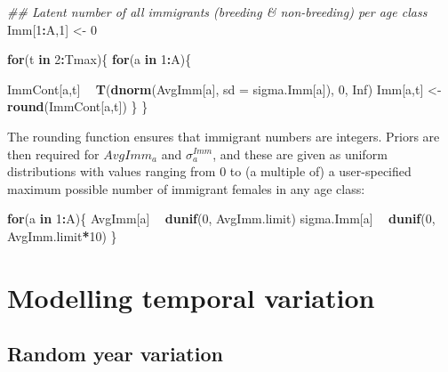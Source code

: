 \documentclass[
]{book}
\newenvironment{Shaded}{\begin{snugshade}}{\end{snugshade}}
\newcommand{\CommentTok}[1]{\textcolor[rgb]{0.56,0.35,0.01}{\textit{#1}}}
\newcommand{\ControlFlowTok}[1]{\textcolor[rgb]{0.13,0.29,0.53}{\textbf{#1}}}
\newcommand{\DataTypeTok}[1]{\textcolor[rgb]{0.13,0.29,0.53}{#1}}
\newcommand{\DecValTok}[1]{\textcolor[rgb]{0.00,0.00,0.81}{#1}}
\newcommand{\KeywordTok}[1]{\textcolor[rgb]{0.13,0.29,0.53}{\textbf{#1}}}
\newcommand{\NormalTok}[1]{#1}
\newcommand{\OperatorTok}[1]{\textcolor[rgb]{0.81,0.36,0.00}{\textbf{#1}}}
\newcommand{\OtherTok}[1]{\textcolor[rgb]{0.56,0.35,0.01}{#1}}
\newcommand{\StringTok}[1]{\textcolor[rgb]{0.31,0.60,0.02}{#1}}
\begin{document}
\begin{Shaded}
\begin{Highlighting}[]
     \CommentTok{## Latent number of all immigrants (breeding & non-breeding) per age class}
\NormalTok{     Imm[}\DecValTok{1}\OperatorTok{:}\NormalTok{A,}\DecValTok{1}\NormalTok{] <-}\StringTok{ }\DecValTok{0}

     \ControlFlowTok{for}\NormalTok{(t }\ControlFlowTok{in} \DecValTok{2}\OperatorTok{:}\NormalTok{Tmax)\{}
       \ControlFlowTok{for}\NormalTok{(a }\ControlFlowTok{in} \DecValTok{1}\OperatorTok{:}\NormalTok{A)\{}

\NormalTok{         ImmCont[a,t] }\OperatorTok{~}\StringTok{ }\KeywordTok{T}\NormalTok{(}\KeywordTok{dnorm}\NormalTok{(AvgImm[a], }\DataTypeTok{sd =}\NormalTok{ sigma.Imm[a]), }\DecValTok{0}\NormalTok{, }\OtherTok{Inf}\NormalTok{)}
\NormalTok{         Imm[a,t] <-}\StringTok{ }\KeywordTok{round}\NormalTok{(ImmCont[a,t])}
\NormalTok{       \}}
\NormalTok{     \}}
\end{Highlighting}
\end{Shaded}

The rounding function ensures that immigrant numbers are integers.
Priors are then required for \(AvgImm_a\) and \(\sigma_a^{Imm}\), and these are
given as uniform distributions with values ranging from 0 to (a multiple of) a
user-specified maximum possible number of immigrant females in any age class:

\begin{Shaded}
\begin{Highlighting}[]
\ControlFlowTok{for}\NormalTok{(a }\ControlFlowTok{in} \DecValTok{1}\OperatorTok{:}\NormalTok{A)\{}
\NormalTok{  AvgImm[a] }\OperatorTok{~}\StringTok{ }\KeywordTok{dunif}\NormalTok{(}\DecValTok{0}\NormalTok{, AvgImm.limit)}
\NormalTok{  sigma.Imm[a] }\OperatorTok{~}\StringTok{ }\KeywordTok{dunif}\NormalTok{(}\DecValTok{0}\NormalTok{, AvgImm.limit}\OperatorTok{*}\DecValTok{10}\NormalTok{)}
\NormalTok{\}}
\end{Highlighting}
\end{Shaded}

\hypertarget{TempVar}{%
\chapter{Modelling temporal variation}\label{TempVar}}

\hypertarget{random-year-variation}{%
\section{Random year variation}\label{random-year-variation}}
\end{document}
